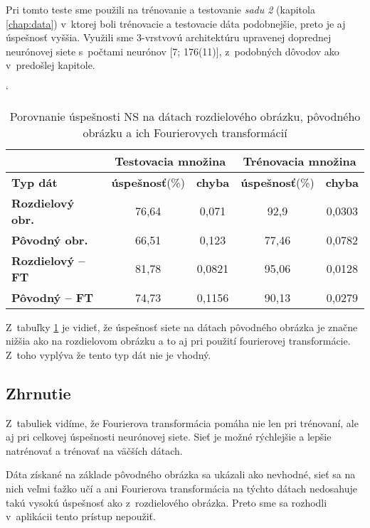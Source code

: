 Pri tomto teste sme použili na trénovanie a testovanie \textit{sadu 2} (kapitola \ref{chap:data}) v~ktorej boli trénovacie a testovacie dáta podobnejšie, preto je aj úspešnosť vyššia. Využili sme 3-vrstvovú architektúru upravenej doprednej neurónovej siete s~počtami neurónov [7; 176(11)], z~podobných dôvodov ako v~predošlej kapitole.

\begin{table}[h]
\catcode` %
\centering
\begin{tabular}{|l|c|c|c|c|}
\cline{2-5}
\multicolumn{1}{l}{} & \multicolumn{2}{|c|}{\textbf{Testovacia množina}} & \multicolumn{2}{c|}{\textbf{Trénovacia množina}}\\ 
\hline
\textbf{Typ dát} & \textbf{úspešnosť}(\%) & \textbf{chyba} & \textbf{úspešnosť}(\%) & \textbf{chyba}\\ \hline
\textbf{Rozdielový obr.} & 76,64 & 0,071 & 92,9 & 0,0303 \\ \hline
\textbf{Pôvodný obr.} & 66,51 & 0,123 & 77,46 & 0,0782 \\ \hline
\textbf{Rozdielový -- FT} & 81,78 & 0,0821 & 95,06 & 0,0128\\ \hline
\textbf{Pôvodný -- FT} & 74,73 & 0,1156 & 90,13 & 0,0279\\ \hline
\end{tabular}
\caption{Porovnanie úspešnosti NS na dátach rozdielového obrázku, pôvodného obrázku a ich Fourierovych transformácií}
\label{tab:neuraldatacmp}
\end{table}

Z~tabuľky \ref{tab:neuraldatacmp} je vidieť, že úspešnosť siete na dátach pôvodného obrázka je značne nižšia ako na rozdielovom obrázku a to aj pri použití fourierovej transformácie. Z~toho vyplýva že tento typ dát nie je vhodný.

\subsection{Zhrnutie}

Z~tabuliek vidíme, že Fourierova transformácia pomáha nie len pri trénovaní, ale aj pri celkovej úspešnosti neurónovej siete. Sieť je možné rýchlejšie a lepšie natrénovať a trénovať na väčších dátach.

Dáta získané na základe pôvodného obrázka sa ukázali ako nevhodné, sieť sa na nich veľmi ťažko učí a ani Fourierova transformácia na týchto dátach nedosahuje takú vysokú úspešnosť ako z~rozdielového obrázka. Preto sme sa rozhodli v~aplikácii tento prístup nepoužiť.
